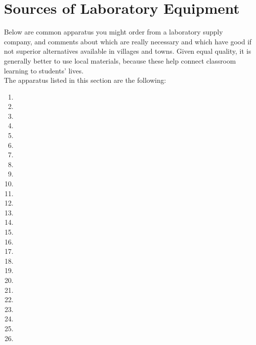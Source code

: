 \chapter{Sources of Laboratory Equipment}
\label{cha:labequip}
Below are common apparatus you might order from a laboratory supply company, 
and comments about which are really necessary 
and which have good if not superior alternatives 
available in villages and towns. 
Given equal quality, 
it is generally better to use local materials, 
because these help connect classroom learning to students' lives.\\

The apparatus listed in this section are the following:\\
\begin{enumerate}
\item {}
\item {}
\item {}
\item {}
\item {}
\item {}
\item {}
\item {}
\item {}
\item {}
\item {}
\item {}
\item {}
\item {}
\item {}
\item {}
\item {}
\item {}
\item {}
\item {}
\item {}
\item {}
\item {}
\item {}
\item {}
\item {}

\end{enumerate}
